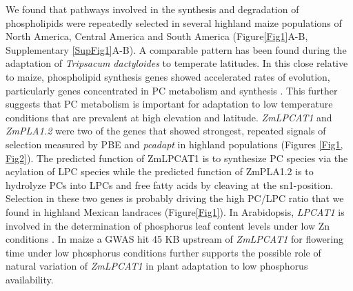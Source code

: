 \documentclass[9pt,twocolumn,twoside]{BioRxiv}
\begin{document}
We found that pathways involved in the synthesis and degradation of phospholipids were repeatedly selected in several highland maize populations of North America, Central America and South America (Figure\ref{Fig1}A-B, Supplementary \ref{SupFig1}A-B). 
A comparable pattern has been found during the adaptation of \textit{Tripsacum dactyloides} to temperate latitudes. 
In this close relative to maize, phospholipid synthesis genes showed accelerated rates of evolution, particularly genes concentrated in PC metabolism and synthesis \cite{Yan2019-tx}.
This further suggests that PC metabolism is important for adaptation to low temperature conditions that are prevalent at high elevation and latitude. 
\textit{ZmLPCAT1} and \textit{ZmPLA1.2} were two of the genes that showed strongest, repeated signals of selection measured by PBE and \textit{pcadapt} in highland populations (Figures \ref{Fig1, Fig2}). 
The predicted function of ZmLPCAT1 is to synthesize PC species via the acylation of LPC species while the predicted function of ZmPLA1.2 is to hydrolyze PCs into LPCs and free fatty acids by cleaving at the sn1-position.
Selection in these two genes is probably driving the high PC/LPC ratio that we found in highland Mexican landraces (Figure\ref{Fig1}).
In Arabidopsis, \textit{LPCAT1} is involved in the determination of phosphorus leaf content levels under low Zn conditions \cite{Kisko2018-zm}.
In maize a GWAS hit 45 KB upstream of \textit{ZmLPCAT1} for flowering time under low phosphorus conditions further supports the possible role of natural variation of \textit{ZmLPCAT1} in plant adaptation to low phosphorus availability. 
\end{document}
